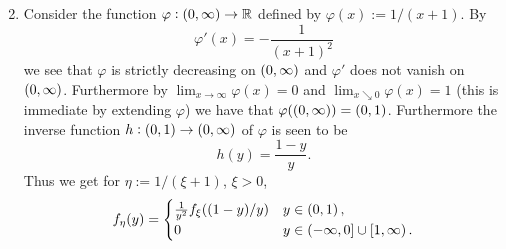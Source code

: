 \begin{enumerate}[label = \textbf{Exercise \arabic*.},wide = 0pt, itemsep=1.5ex]
\begin{equation}
		\end{equation}
	\item Consider the function $\varphi: \intoo{0,\infty} \to \mathbb{R}$ defined by $\varphi(x) := 1/(x + 1)$. By 
		\begin{equation}
			\varphi'(x) = -\frac{1}{(x + 1)^2}
		\end{equation}
		\noindent we see that $\varphi$ is strictly decreasing on $\intoo{0,\infty}$ and $\varphi'$ does not vanish on $\intoo{0,\infty}$. Furthermore by $\lim_{x \to \infty}\varphi(x) = 0$ and $\lim_{x \searrow 0}\varphi(x) = 1$ (this is immediate by extending $\varphi$) we have that $\varphi(\intoo{0,\infty}) = \intoo{0,1}$. Furthermore the inverse function $h: \intoo{0,1} \to \intoo{0,\infty}$ of $\varphi$ is seen to be
		\begin{equation}
			h(y) = \frac{1 - y}{y}.
		\end{equation}
		Thus we get for $\eta := 1/(\xi + 1)$, $\xi > 0$,
		\begin{align*}
			f_\eta(y) = \begin{cases}
				\frac{1}{y^2}f_\xi ((1 - y)/y) & y \in \intoo{0,1},\\
				0 & y \in \intoc{-\infty,0} \cup \intco{1,\infty}.
			\end{cases}
		\end{align*}
\end{enumerate}
\printbibliography

